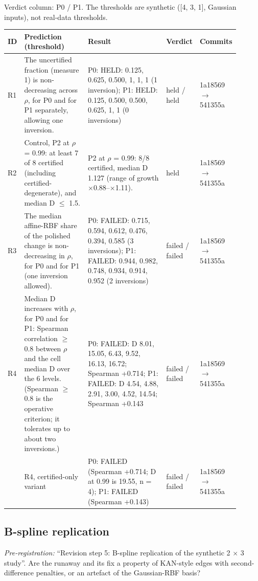 Verdict column: P0 / P1. The thresholds are synthetic ([4, 3, 1], Gaussian inputs), not real-data thresholds.

{\footnotesize\setlength{\tabcolsep}{3pt}
\begin{longtable}{R{0.07\linewidth} R{0.28\linewidth} R{0.35\linewidth} R{0.09\linewidth} R{0.11\linewidth}}
\toprule
ID & Prediction (threshold) & Result & Verdict & Commits \\
\midrule
\endhead
R1 & The uncertified fraction (measure 1) is non-decreasing across $\rho$, for P0 and for P1 separately, allowing one inversion. & P0: HELD: 0.125, 0.625, 0.500, 1, 1, 1 (1 inversion); P1: HELD: 0.125, 0.500, 0.500, 0.625, 1, 1 (0 inversions) & held / held & 1a18569$\to$\allowbreak 541355a \\
R2 & Control, P2 at $\rho$ = 0.99: at least 7 of 8 certified (including certified-degenerate), and median D $\leq$ 1.5. & P2 at $\rho$ = 0.99: 8/8 certified, median D 1.127 (range of growth $\times$0.88--$\times$1.11). & held & 1a18569$\to$\allowbreak 541355a \\
R3 & The median affine-RBF share of the polished change is non-decreasing in $\rho$, for P0 and for P1 (one inversion allowed). & P0: FAILED: 0.715, 0.594, 0.612, 0.476, 0.394, 0.585 (3 inversions); P1: FAILED: 0.944, 0.982, 0.748, 0.934, 0.914, 0.952 (2 inversions) & failed / failed & 1a18569$\to$\allowbreak 541355a \\
R4 & Median D increases with $\rho$, for P0 and for P1: Spearman correlation $\geq$ 0.8 between $\rho$ and the cell median D over the 6 levels. (Spearman $\geq$ 0.8 is the operative criterion; it tolerates up to about two inversions.) & P0: FAILED: D 8.01, 15.05, 6.43, 9.52, 16.13, 16.72; Spearman +0.714; P1: FAILED: D 4.54, 4.88, 2.91, 3.00, 4.52, 14.54; Spearman +0.143 & failed / failed & 1a18569$\to$\allowbreak 541355a \\
 & R4, certified-only variant & P0: FAILED (Spearman +0.714; D at 0.99 is 19.55, n = 4); P1: FAILED (Spearman +0.143) & failed / failed & 1a18569$\to$\allowbreak 541355a \\
\bottomrule
\end{longtable}}
\subsection{B-spline replication}
\noindent\textit{Pre-registration:} ``Revision step 5: B-spline replication of the synthetic 2 $\times$ 3 study''. Are the runaway and its fix a property of KAN-style edges with second-difference penalties, or an artefact of the Gaussian-RBF basis?

